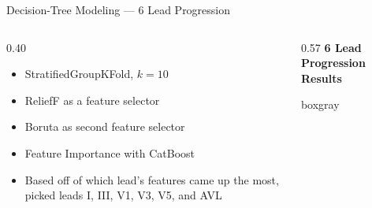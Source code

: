 \documentclass[10pt,aspectratio=169]{beamer}
\newcommand{\Raleway}{\sffamily}
\begin{document}
\begin{frame}{Decision-Tree Modeling --- 6 Lead Progression}

  \begin{columns}[T, onlytextwidth]

    \begin{column}{0.40\textwidth}
      \vspace{0.2em}
      \color{coolgray}
      \begin{itemize}
        \item StratifiedGroupKFold, $k = 10$
        \item ReliefF as a feature selector
        \item Boruta as second feature selector
        \item Feature Importance with CatBoost
        \item Based off of which lead's features came up the most, picked leads I, III, V1, V3, V5, and AVL
      \end{itemize}
    \end{column}

    \begin{column}{0.57\textwidth}
      \centering
      {\scriptsize\Raleway\bfseries\color{aggieblue} 6 Lead Progression Results}\\[0.3em]
      \begin{beamercolorbox}[wd=\textwidth,rounded=true,leftskip=0.2em,rightskip=0.2em,sep=0.4em]{boxgray}
        \small
      \end{beamercolorbox}
    \end{column}

  \end{columns}
\end{frame}
\end{document}
